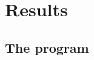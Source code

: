 \chapter{Results}
\label{chap:results}

\section{The program}

\setlength{\screenshotwidth}{.475\textwidth}

\setlength{\screenshotunitlength}{.295\textwidth}

\setlength{\initiallinewidth}{.20pt}

